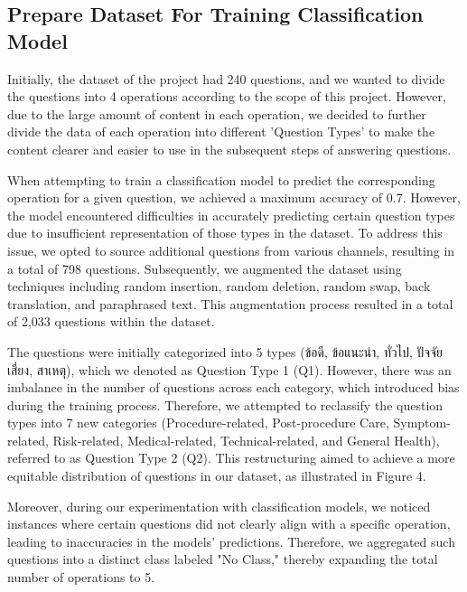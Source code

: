 \documentclass[12pt,oneside,openright,a4paper]{cpe-english-project}
\begin{document}
    \subsection{Prepare Dataset For Training Classification Model}
      \qquad Initially, the dataset of the project had 240 questions, and we wanted to divide the questions into 4 operations according to the scope of this project. However, due to the large amount of content in each operation, we decided to further divide the data of each operation into different 'Question Types' to make the content clearer and easier to use in the subsequent steps of answering questions. \par
      \qquad When attempting to train a classification model to predict the corresponding operation for a given question, we achieved a maximum accuracy of 0.7. However, the model encountered difficulties in accurately predicting certain question types due to insufficient representation of those types in the dataset. To address this issue, we opted to source additional questions from various channels, resulting in a total of 798 questions. Subsequently, we augmented the dataset using techniques including random insertion, random deletion, random swap, back translation, and paraphrased text. This augmentation process resulted in a total of 2,033 questions within the dataset. \par
      \qquad The questions were initially categorized into 5 types \textthai{(ข้อดี, ข้อแนะนำ, ทั่วไป, ปัจจัยเสี่ยง, สาเหตุ)}, which we denoted as Question Type 1 (Q1). However, there was an imbalance in the number of questions across each category, which introduced bias during the training process. Therefore, we attempted to reclassify the question types into 7 new categories (Procedure-related, Post-procedure Care, Symptom-related, Risk-related, Medical-related, Technical-related, and General Health), referred to as Question Type 2 (Q2). This restructuring aimed to achieve a more equitable distribution of questions in our dataset, as illustrated in Figure 4. \par
      \qquad Moreover, during our experimentation with classification models, we noticed instances where certain questions did not clearly align with a specific operation, leading to inaccuracies in the models’ predictions. Therefore, we aggregated such questions into a distinct class labeled "No Class," thereby expanding the total number of operations to 5. \par
\end{document}
